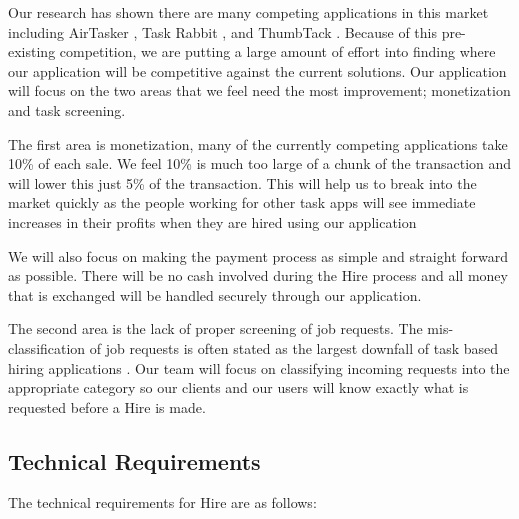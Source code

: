 \documentclass[11pt]{article}
\begin{document}
Our research has shown there are many competing applications in this market including AirTasker \cite{AirTasker}, Task Rabbit \cite{TaskRabbit}, and ThumbTack \cite{ThumbTack}. 
Because of this pre-existing competition, we are putting a large amount of effort into finding where our application will be competitive against the current solutions. 
Our application will focus on the two areas that we feel need the most improvement; monetization and task screening.

The first area is monetization, many of the currently competing applications take 10\% of each sale. 
We feel 10\% is much too large of a chunk of the transaction and will lower this just 5\% of the transaction. 
This will help us to break into the market quickly as the people working for other task apps will see immediate increases in their profits when they are hired using our application

We will also focus on making the payment process as simple and straight forward as possible. 
There will be no cash involved during the Hire process and all money that is exchanged will be handled securely through our application.

The second area is the lack of proper screening of job requests. 
The mis-classification of job requests is often stated as the largest downfall of task based hiring applications \cite{ThumbTack_sucks}. 
Our team will focus on classifying incoming requests into the appropriate category so our clients and our users will know exactly what is requested before a Hire is made.

\subsection{Technical Requirements}

The technical requirements for Hire are as follows:
\end{document}
